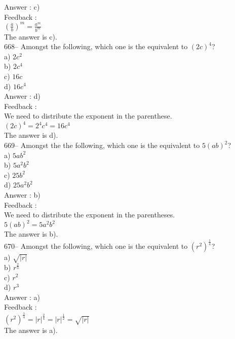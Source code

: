 \documentclass[letterpaper, 12pt]{article}
\begin{document}
Answer : c)\\

Feedback : \\[2mm]
$\left( \frac{a}{b}\right)^{m} =\frac{a^{m}}{b^{m}}$\\[2mm]
The answer is c).\\

668-- Amongst the following, which one is the equivalent to $\left( 2c\right) ^{4}$?\\
a) $2c^{2}$\\
b) $2c^{4}$\\
c) $16c$\\
d) $16c^{4}$\\

Answer : d)\\

Feedback : \\
We need to distribute the exponent in the parenthese.\\
$\left( 2c\right) ^{4}=2^{4}c^{4}=16c^{4}$\\
The answer is d).\\

669-- Amongst the the following, which one is the equivalent to
$5\left( ab\right) ^{2}$?\\
a) $5ab^{2}$\\
b) $5a^{2}b^{2}$\\
c) $25b^{2}$\\
d) $25a^{2}b^{2}$\\

Answer : b)\\

Feedback : \\
We need to distribute the exponent in the parentheses.\\
$5\left( ab\right) ^{2}=5a^{2}b^{2}$\\
The answer is b).\\

670-- Amongst the following, which one is the equivalent to
$\left( r^{2}\right)^\frac{1}{4}$?\\
a) $\sqrt{|r|}$\\
b) $r^{\frac{2}{3}}$\\
c) $r^{2}$\\
d) $r^{3}$\\

Answer : a)\\

Feedback : \\
$\left( r^{2}\right)^\frac{1}{4}=|r|^\frac{2}{4}=|r|^\frac{1}{2}=\sqrt{|r|}$\\
The answer is a).\\
\end{document}
